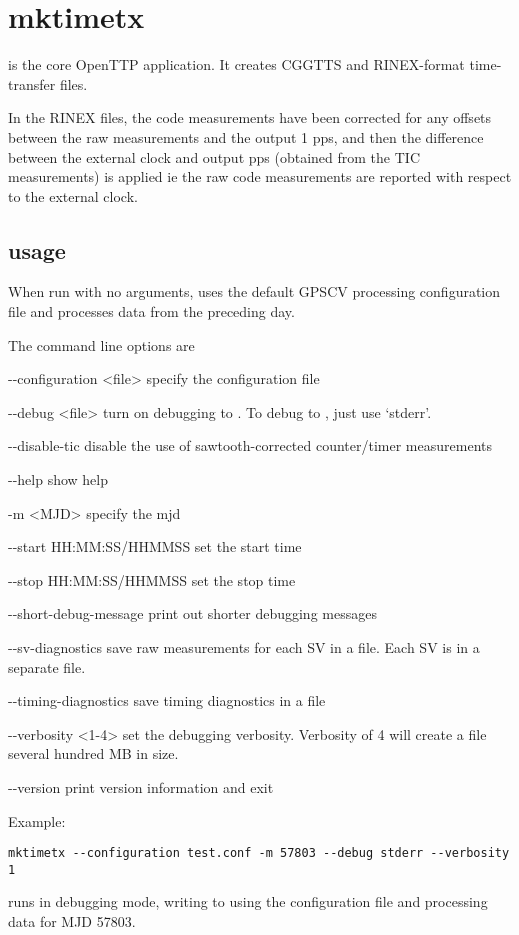 
\section{mktimetx}

\hypertarget{h:mktimetx}{}

 is the core OpenTTP application.
It creates CGGTTS and RINEX-format time-transfer files.

In the RINEX files, the code measurements have been corrected for any offsets between the raw measurements
and the output 1 pps, and then the difference between the external clock and output pps (obtained from the TIC measurements)
is applied ie the raw code measurements are reported with respect to the external clock.

\subsection{usage}

When run with no arguments,  uses the default GPSCV processing configuration file 
 and processes data from the preceding day.

The command line options are
\begin{description*}
	\item[-{}-configuration \textless file\textgreater] specify the configuration file
	\item[-{}-debug \textless file\textgreater]	turn on debugging to . To debug to , just use `stderr'.
	\item[-{}-disable-tic] disable the use of sawtooth-corrected counter/timer measurements 
	\item[-{}-help] show help
	\item[-m \textless MJD\textgreater] specify the mjd
	\item[-{}-start] HH:MM:SS/HHMMSS  set the start time
	\item[-{}-stop]  HH:MM:SS/HHMMSS  set the stop time
	\item[-{}-short-debug-message] print out shorter debugging messages
	\item[-{}-sv-diagnostics] save raw measurements for each SV in a file. Each SV is in a separate file.
	\item[-{}-timing-diagnostics] save timing diagnostics in a file
	\item[-{}-verbosity \textless 1-4\textgreater] set the debugging verbosity. Verbosity of 4 will create a file several  hundred MB
	  in size.
	\item[-{}-version] print version information	and exit
\end{description*}
Example:
\begin{lstlisting}
mktimetx --configuration test.conf -m 57803 --debug stderr --verbosity 1 
\end{lstlisting}
runs  in debugging mode, writing to  using the configuration file  and processing
data for MJD 57803.

